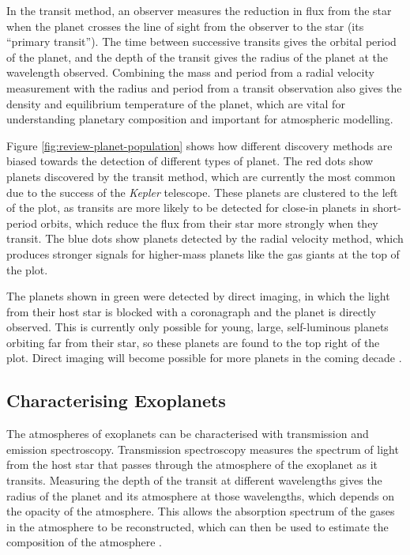 In the transit method, an observer measures the reduction in flux from the star when the planet crosses the line of sight from the observer to the star (its ``primary transit''). The time between successive transits gives the orbital period of the planet, and the depth of the transit gives the radius of the planet at the wavelength observed. Combining the mass and period from a radial velocity measurement with the radius and period from a transit observation also gives the density and equilibrium temperature of the planet, which are vital for understanding planetary composition and important for atmospheric modelling.

Figure \ref{fig:review-planet-population} shows how different discovery methods are biased towards the detection of different types of planet. The red dots show planets discovered by the transit method, which are currently the most common due to the success of the \textit{Kepler} telescope. These planets are clustered to the left of the plot, as transits are more likely to be detected for close-in planets in short-period orbits, which reduce the flux from their star more strongly when they transit. The blue dots show planets detected by the radial velocity method, which produces stronger signals for higher-mass planets like the gas giants at the top of the plot.

The planets shown in green were detected by direct imaging, in which the light from their host star is blocked with a coronagraph and the planet is directly observed. This is currently only possible for young, large, self-luminous planets orbiting far from their star, so these planets are found to the top right of the plot. Direct imaging will become possible for more planets in the coming decade \citep{perryman2018exoplanet}.

\subsection{Characterising Exoplanets}

The atmospheres of exoplanets can be characterised with transmission and emission spectroscopy. Transmission spectroscopy measures the spectrum of light from the host star that passes through the atmosphere of the exoplanet as it transits. Measuring the depth of the transit at different wavelengths gives the radius of the planet and its atmosphere at those wavelengths, which depends on the opacity of the atmosphere. This allows the absorption spectrum of the gases in the atmosphere to be reconstructed, which can then be used to estimate the composition of the atmosphere \citep{tsiaras2016detection}.



